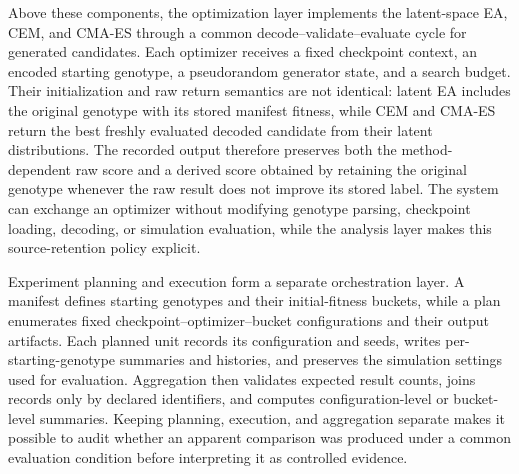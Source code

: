 Above these components, the optimization layer implements the latent-space EA, CEM, and CMA-ES through a common decode--validate--evaluate cycle for generated candidates. Each optimizer receives a fixed checkpoint context, an encoded starting genotype, a pseudorandom generator state, and a search budget. Their initialization and raw return semantics are not identical: latent EA includes the original genotype with its stored manifest fitness, while CEM and CMA-ES return the best freshly evaluated decoded candidate from their latent distributions. The recorded output therefore preserves both the method-dependent raw score and a derived score obtained by retaining the original genotype whenever the raw result does not improve its stored label. The system can exchange an optimizer without modifying genotype parsing, checkpoint loading, decoding, or simulation evaluation, while the analysis layer makes this source-retention policy explicit.

Experiment planning and execution form a separate orchestration layer. A manifest defines starting genotypes and their initial-fitness buckets, while a plan enumerates fixed checkpoint--optimizer--bucket configurations and their output artifacts. Each planned unit records its configuration and seeds, writes per-starting-genotype summaries and histories, and preserves the simulation settings used for evaluation. Aggregation then validates expected result counts, joins records only by declared identifiers, and computes configuration-level or bucket-level summaries. Keeping planning, execution, and aggregation separate makes it possible to audit whether an apparent comparison was produced under a common evaluation condition before interpreting it as controlled evidence.

